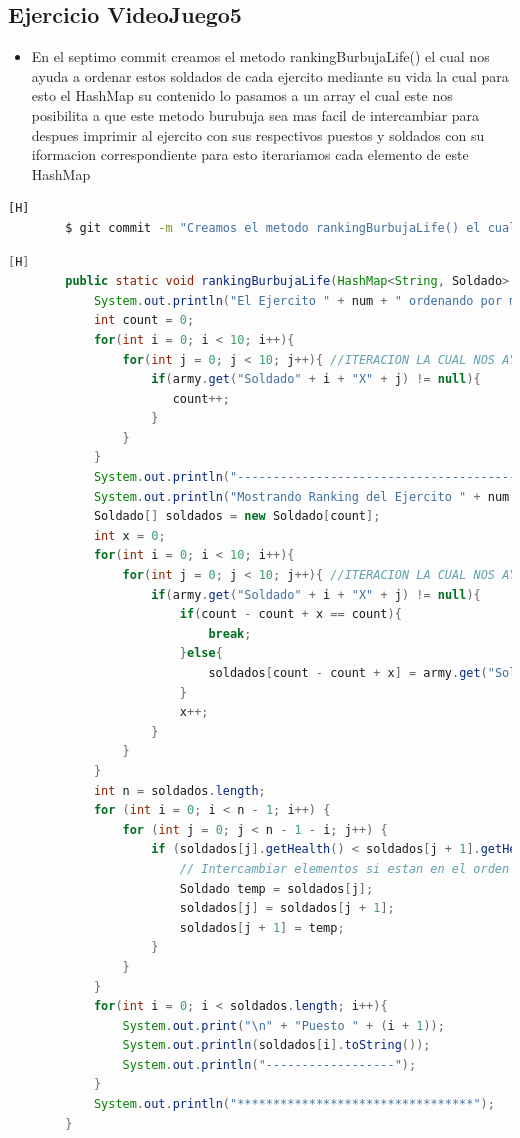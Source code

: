 \documentclass{article}
\begin{document}
	\subsection{Ejercicio VideoJuego5}
	\begin{itemize}	
		\item En el septimo commit creamos el metodo rankingBurbujaLife() el cual nos ayuda a ordenar estos soldados de cada ejercito mediante su vida la cual para esto el HashMap su contenido lo pasamos a un array el cual este nos posibilita a que este metodo burubuja sea mas facil de intercambiar para despues imprimir al ejercito con sus respectivos puestos y soldados con su iformacion correspondiente para esto iterariamos cada elemento de este HashMap
	\end{itemize}	
	\begin{lstlisting}[language=bash,caption={Commit}][H]
		$ git commit -m "Creamos el metodo rankingBurbujaLife() el cual nos ayuda a ordenar estos soldados de cada ejercito mediante su vida la cual para esto el HashMap su contenido lo pasamos a un array el cual este nos posibilita a que este metodo burubuja sea mas facil de intercambiar para despues imprimir al ejercito con sus respectivos puestos y soldados con su iformacion correspondiente para esto iterariamos cada elemento de este HashMap"
	\end{lstlisting}	
	\begin{lstlisting}[language=java,caption={Las lineas de codigos del metodo creado:}][H]
		public static void rankingBurbujaLife(HashMap<String, Soldado> army , int num){
			System.out.println("El Ejercito " + num + " ordenando por metodo burbuja: ");
			int count = 0;
			for(int i = 0; i < 10; i++){
				for(int j = 0; j < 10; j++){ //ITERACION LA CUAL NOS AYUDA A PASAR POR TODOS LOS SOLDADOS DE CADA EJERCITO
					if(army.get("Soldado" + i + "X" + j) != null){ 
					   count++;
					}
				}
			}
			System.out.println("------------------------------------------");
			System.out.println("Mostrando Ranking del Ejercito " + num + " ..... ////// --->");
			Soldado[] soldados = new Soldado[count];
			int x = 0;
			for(int i = 0; i < 10; i++){
				for(int j = 0; j < 10; j++){ //ITERACION LA CUAL NOS AYUDA A PASAR POR TODOS LOS SOLDADOS AL ARRAY SOLDADO PARA PODER USAR EL USO DEL METODO DE ORDENACION BURBUJA
					if(army.get("Soldado" + i + "X" + j) != null){ 
						if(count - count + x == count){
							break;
						}else{
							soldados[count - count + x] = army.get("Soldado" + i + "X" + j);
						}
						x++;   
					}
				}
			}
			int n = soldados.length;
			for (int i = 0; i < n - 1; i++) {
				for (int j = 0; j < n - 1 - i; j++) {
					if (soldados[j].getHealth() < soldados[j + 1].getHealth()) {
						// Intercambiar elementos si estan en el orden incorrecto
						Soldado temp = soldados[j];
						soldados[j] = soldados[j + 1];
						soldados[j + 1] = temp;
					}
				}
			}
			for(int i = 0; i < soldados.length; i++){
				System.out.print("\n" + "Puesto " + (i + 1));
				System.out.println(soldados[i].toString());
				System.out.println("------------------");
			}
			System.out.println("*********************************");
		}
	\end{lstlisting}
\end{document}
